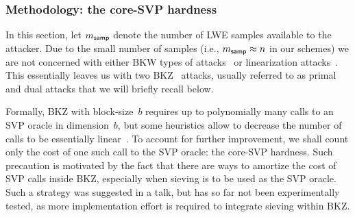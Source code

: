 \subsubsection{Methodology: the core-SVP hardness}
\label{subsec:coreSVPharness}

In this section, let $m_{\mathsf{samp}}$ denote the number of LWE samples
available to the attacker. Due to the small number of samples (i.e., $m_{\mathsf{samp}} \approx n$
in our schemes) we are not concerned with either BKW types of
attacks~\cite{C:KirFou15} or linearization attacks~\cite{ICALP:AroGe11}. This essentially leaves us with two BKZ~\cite{AC:CheNgu11} attacks, usually referred to as primal and dual attacks that we will briefly recall below.





Formally, BKZ with block-size~$b$ requires up to polynomially many
calls to an SVP oracle in dimension~$b$, but some heuristics allow to
decrease the number of calls to be essentially
linear~\cite{ChenThesis}. To account for further improvement, we shall
count only the cost of one such call to the SVP oracle: the core-SVP
hardness. Such precaution is motivated by the fact that there are ways
to amortize the cost of SVP calls inside BKZ, especially when sieving
is to be used as the SVP oracle. Such a strategy was suggested in a
talk, but has so far not been experimentally tested, as more
implementation effort is required to integrate sieving within BKZ.

